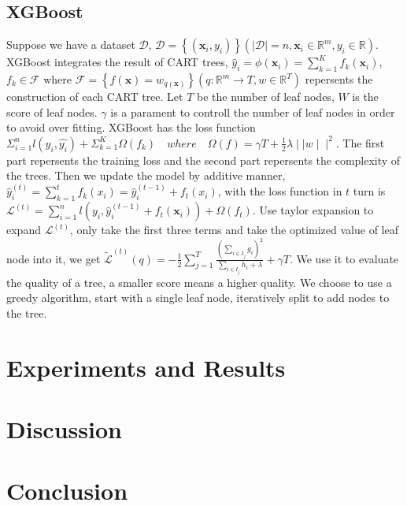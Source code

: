 \documentclass{article}
\begin{document}
\subsection{XGBoost}
Suppose we have a dataset $\mathcal{D}$, $\mathcal{D}=\left\{\left(\mathbf{x}_{i}, y_{i}\right)\right\}\left(|\mathcal{D}|=n, \mathbf{x}_{i} \in \mathbb{R}^{m}, y_{i} \in \mathbb{R}\right)$. XGBoost  integrates the result of CART trees, $\hat{y}_{i}=\phi\left(\mathbf{x}_{i}\right)=\sum_{k=1}^{K} f_{k}\left(\mathbf{x}_{i}\right)$, $f_{k} \in \mathcal{F}$ where  $\mathcal{F}=\left\{f(\mathbf{x})=w_{q(\mathbf{x})}\right\}\left(q: \mathbb{R}^{m} \rightarrow T, w \in \mathbb{R}^{T}\right)$ repersents the construction of each CART tree. Let $T$ be the number of leaf nodes, $W$ is the score of leaf nodes. $\gamma$ is a parament to controll the number of leaf nodes in order to  avoid over fitting. XGBoost has the loss function $\Sigma_{i = 1}^n l(y_i,\hat{y_i})+\Sigma_{k = 1}^K\Omega(f_k) \quad where \quad  \Omega(f) = \gamma T + \frac{1}{2}\lambda\mid\mid w\mid\mid^2$. The first part repersents the training loss and the second part repersents the complexity of the trees. Then we update the model by additive manner, $\hat{y}_{i}^{(t)}=\sum_{k=1}^{t} f_{k}\left(x_{i}\right)=\hat{y}_{i}^{(t-1)}+f_{t}\left(x_{i}\right)$, with the loss function in $t$ turn is $\mathcal{L}^{(t)}=\sum_{i=1}^{n} l\left(y_{i}, \hat{y}_{i}^{(t-1)}+f_{t}\left(\mathbf{x}_{i}\right)\right)+\Omega\left(f_{t}\right)$. Use taylor expansion to expand $\mathcal{L}^{(t)}$, only take the first three terms and take the optimized value of leaf node into it, we get $\tilde{\mathcal{L}}^{(t)}(q)=-\frac{1}{2} \sum_{j=1}^{T} \frac{\left(\sum_{i \in I_{j}} g_{i}\right)^{2}}{\sum_{i \in I_{j}} h_{i}+\lambda}+\gamma T$. We use it to evaluate the quality of a tree, a smaller score means a higher quality. We choose to use a greedy algorithm, start with a single leaf node, iteratively split to add nodes to the tree.



\section{Experiments and Results}

\section{Discussion}

\section{Conclusion}
\end{document}
